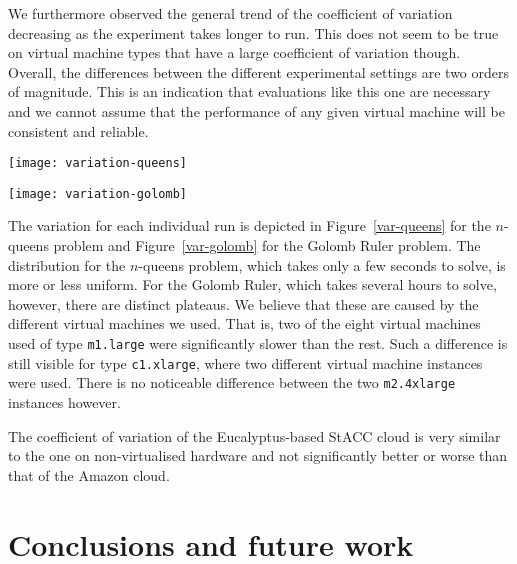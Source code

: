 \documentclass{llncs}
\begin{document}
We furthermore observed the general trend of the coefficient of variation
decreasing as the experiment takes longer to run. This does not seem to be true
on virtual machine types that have a large coefficient of variation though.
Overall, the differences between the different experimental settings are two
orders of magnitude. This is an indication that evaluations like this one are
necessary and we cannot assume that the performance of any given virtual machine
will be consistent and reliable.

\begin{figure*}
\texttt{[image: variation-queens]}
\caption{Relative deviation from the median CPU time for the $n$-queens
problem for each run. 1 is the median value, 2 means that the run took twice as
long as the median and 0 means that it took no time.}
\label{var-queens}
\end{figure*}

\begin{figure*}
\texttt{[image: variation-golomb]}
\caption{Relative deviation from the median CPU time for the Golomb Ruler
problem for each run.}
\label{var-golomb}
\end{figure*}

The variation for each individual run is depicted in Figure~\ref{var-queens} for
the $n$-queens problem and Figure~\ref{var-golomb} for the Golomb Ruler problem.
The distribution for the $n$-queens problem, which takes only a few seconds to
solve, is more or less uniform. For the Golomb Ruler, which takes several hours
to solve, however, there are distinct plateaus. We believe that these are caused
by the different virtual machines we used. That is, two of the eight virtual
machines used of type \texttt{m1.large} were significantly slower than the rest.
Such a difference is still visible for type \texttt{c1.xlarge}, where two
different virtual machine instances were used. There is no noticeable difference
between the two \texttt{m2.4xlarge} instances however.

The coefficient of variation of the Eucalyptus-based StACC cloud is very similar
to the one on non-virtualised hardware and not significantly better or worse
than that of the Amazon cloud.

\section{Conclusions and future work}
\end{document}
